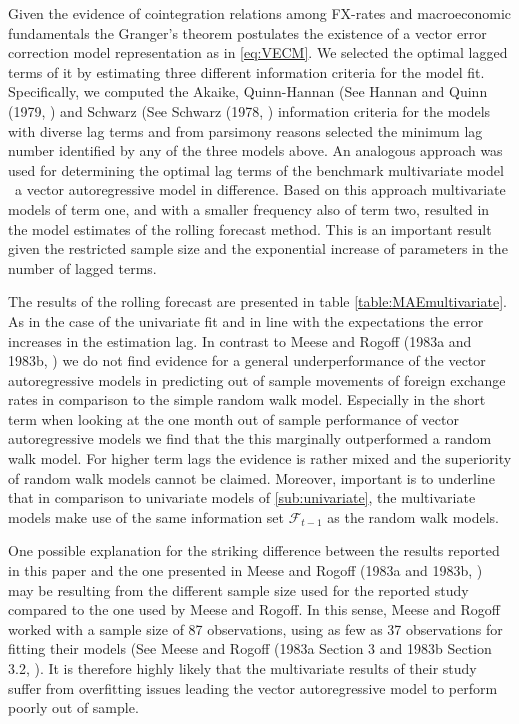 Given the evidence of cointegration relations among FX-rates and macroeconomic fundamentals the Granger's theorem postulates the existence of
a vector error correction model representation as in \ref{eq:VECM}. We selected the optimal lagged terms of it by estimating three different
information criteria for the model fit. Specifically, we computed the Akaike, Quinn-Hannan (See Hannan and Quinn (1979, \cite{QuinnHannan})
and Schwarz (See Schwarz (1978, \cite{Schwarz}) information criteria for the models with diverse lag terms and from parsimony reasons selected the minimum lag number identified by any of the three models above. An analogous approach was used for determining
the optimal lag terms of the benchmark multivariate model \textendash \ a vector autoregressive model in difference. Based on this approach multivariate models
of term one, and with a smaller frequency also of term two, resulted in the model estimates of the rolling forecast method.
This is an important result given the restricted sample size and the exponential increase of parameters in the number of lagged terms.

The results of the rolling forecast are presented in table \ref{table:MAEmultivariate}. As in the case of the univariate fit and in line
with the expectations the error increases in the estimation lag. In contrast to Meese and Rogoff (1983a and 1983b,
\cite{MeeseRogoffa, MeeseRogoffb}) we do not find evidence for a general underperformance of the vector autoregressive models in predicting out of
sample movements of foreign exchange rates in comparison to the simple random walk model. Especially in the short term when looking at the one month
out of sample performance of vector autoregressive models we find that the this marginally outperformed a random walk model. For higher term lags the
evidence is rather mixed and the superiority of random walk models cannot be claimed. Moreover, important is to underline that in comparison to
univariate models of \ref{sub:univariate}, the multivariate models make use of the same information set $\mathscr{F}_{t-1}$ as the random walk models.

One possible explanation for the striking difference between the results reported in this paper and the one presented in Meese and Rogoff (1983a and 1983b,
\cite{MeeseRogoffa, MeeseRogoffb}) may be resulting from the different sample size used for the reported study compared to the one used by Meese and Rogoff.
In this sense, Meese and Rogoff worked with a sample size of 87 observations, using as few as 37 observations for fitting
their models (See Meese and Rogoff (1983a Section 3 and 1983b Section 3.2, \cite{MeeseRogoffa, MeeseRogoffb}).
It is therefore highly likely that the multivariate results of their study suffer from overfitting issues leading the vector
autoregressive model to perform poorly out of sample.


